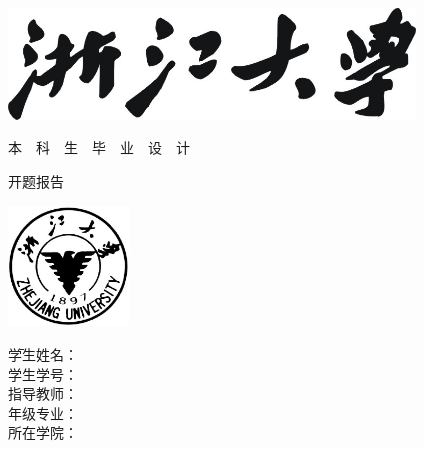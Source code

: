 
\thispagestyle{empty}

\vspace{5mm}

\begin{center}
  \includegraphics[width=108mm]{images/zjdx}
\end{center}

\vspace{10mm}

{
\heiti\erhao\bfseries
\centerline{本~~科~~生~~毕~~业~~设~~计}
\centerline{开题报告}
\vspace{18mm}
}

\begin{center}
  \includegraphics[width=32mm]{images/standxb}
\end{center}

\vspace{15mm}

{
\songti\sanhao\bfseries
\begin{tabbing}
  \hspace{20mm}
  \= 学生姓名：\= \underline{\makebox[7cm]{\zjuauthornamec}} \\[2mm]
  \> 学生学号： \> \underline{\makebox[7cm]{\zjuauthorid}} \\[2mm]
  \> 指导教师： \> \underline{\makebox[7cm]{\zjumentorc}} \\[2mm]
  \> 年级专业： \> \underline{\makebox[7cm]{\zjugrade\zjumajor}} \\[2mm]
  \> 所在学院： \> \underline{\makebox[7cm]{\zjucollegec}} \\[2mm]
\end{tabbing}
}

